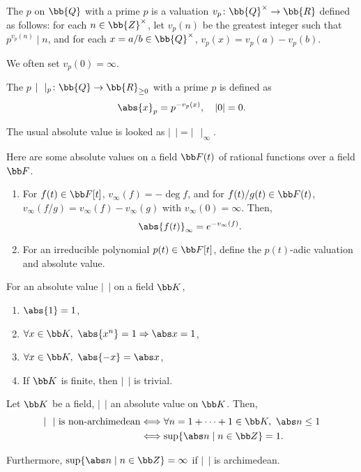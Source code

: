 The $p$ on $\bb{Q}$ with a prime $p$ is a valuation $v_p \colon \bb{Q}^\times \to \bb{R}$ defined as follows: for each $n \in \bb{Z}^\times$, let $v_p(n)$ be the greatest integer such that $p^{v_p(n)} \mid n$, and for each $x = a / b \in \bb{Q}^\times$, $v_p(x) = v_p(a) - v_p(b)$.

We often set $v_p(0) = \infty$.

The $p$ $\mid\ \ \mid_p \colon \bb{Q} \to \bb{R}_{\ge0}$ with a prime $p$ is defined as
\[
\abs{x}_p = p^{-v_p(x)},\quad |0| = 0.
\]

The usual absolute value is looked as $\mid\ \ \mid = \mid\ \ \mid_\infty$.


Here are some absolute values on a field $\bb F(t)$ of rational functions over a field $\bb F$.

\begin{enumerate}
\item For $f(t) \in \bb F[t]$, $v_\infty (f) = -\deg f$, and for $f(t)/g(t) \in \bb F(t)$, $v_\infty (f/g) = v_\infty(f) - v_\infty (g)$ with $v_\infty (0) = \infty$. Then,
\[
\abs{f(t)}_\infty = e^{-v_\infty (f)}.
\]
\item For an irreducible polynomial $p(t) \in \bb F[t]$, define the $p(t)$-adic valuation and absolute value.
\end{enumerate}

For an absolute value $|\ \ |$ on a field $\bb K$,
\begin{enumerate}
\item $\abs{1} = 1$,
\item $\forall x \in \bb K,\ \abs{x^n} = 1 \Rightarrow \abs x = 1$,
\item $\forall x \in \bb K,\ \abs{-x} = \abs x$,
\item If $\bb K$ is finite, then $|\ \ |$ is trivial.
\end{enumerate}


Let $\bb K$ be a field, $|\ \ |$ an absolute value on $\bb K$. Then,
\begin{align*}
|\ \ |\ \text{is non-archimedean} &\Longleftrightarrow \forall n = 1 + \dotsb + 1 \in \bb K,\ \abs n \le 1 \\
&\Longleftrightarrow \sup \{ \abs n \mid n \in \bb Z \} = 1.
\end{align*}

Furthermore, $\sup \{ \abs n \mid n \in \bb Z \} = \infty$ if $|\ \ |$ is archimedean.　
